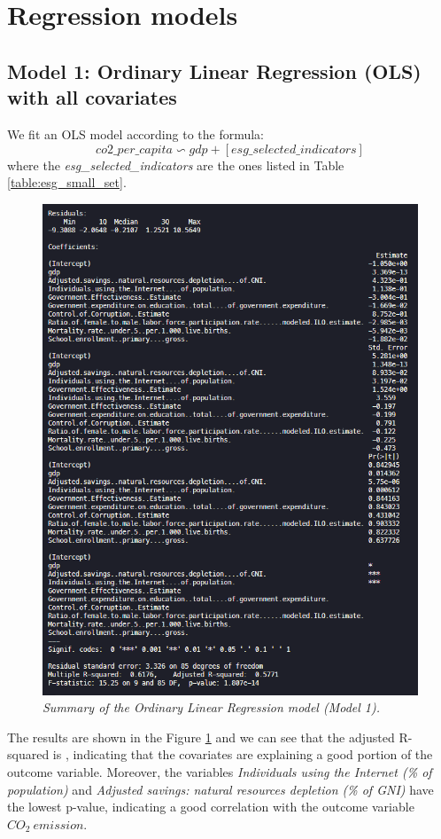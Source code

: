 \documentclass{article}
\begin{document}
	\section{Regression models}
	
	\subsection{Model 1: Ordinary Linear Regression (OLS) with all covariates}

	We fit an OLS model according to the formula:
	\begin{equation}
		co2\_per\_capita \backsim gdp + [esg\_selected\_indicators]
	\end{equation}
	where the \textit{esg\_selected\_indicators} are the ones listed in Table \ref{table:esg_small_set}.
	\begin{figure} 
		\centering
		\includegraphics[width=1\linewidth]{summary_mod1.png}
		\caption{\textit{Summary of the Ordinary Linear Regression model (Model 1).}}
		\label{fig:summary_mod1}
	\end{figure}
	The results are shown in the Figure \ref{fig:summary_mod1} and we can see that the adjusted R-squared is , indicating that the covariates are explaining a good portion of the outcome variable. Moreover, the variables \textit{Individuals using the Internet (\% of population)} and \textit{Adjusted savings: natural resources depletion (\% of GNI)} have the lowest p-value, indicating a good correlation with the outcome variable $CO_2\ emission$.
\end{document}
